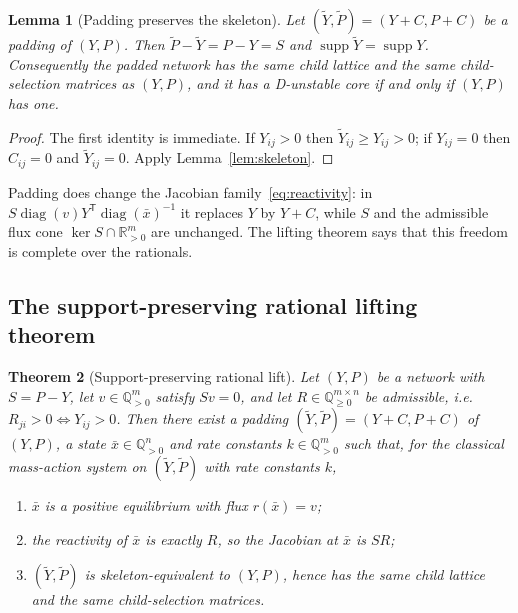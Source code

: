 \documentclass[11pt,a4paper]{article}
\theoremstyle{plain}
\newtheorem{theorem}{Theorem}[section]
\newtheorem{lemma}[theorem]{Lemma}
\theoremstyle{definition}
\theoremstyle{remark}
\newcommand{\R}{\mathbb{R}}
\newcommand{\Q}{\mathbb{Q}}
\newcommand{\diag}{\operatorname{diag}}
\newcommand{\supp}{\operatorname{supp}}
\newcommand{\Ytil}{\widetilde{Y}}
\newcommand{\Ptil}{\widetilde{P}}
\newcommand{\xbar}{\bar{x}}
\begin{document}
\begin{lemma}[Padding preserves the skeleton]\label{lem:padding}
Let $(\Ytil,\Ptil)=(Y+C,P+C)$ be a padding of $(Y,P)$. Then $\Ptil-\Ytil=P-Y=S$ and $\supp\Ytil=\supp Y$. Consequently the padded network has the same child lattice and the same child-selection matrices as $(Y,P)$, and it has a D-unstable core if and only if $(Y,P)$ has one.
\end{lemma}

\begin{proof}
The first identity is immediate. If $Y_{ij}>0$ then $\Ytil_{ij}\ge Y_{ij}>0$; if $Y_{ij}=0$ then $C_{ij}=0$ and $\Ytil_{ij}=0$. Apply Lemma~\ref{lem:skeleton}.
\end{proof}

Padding does change the Jacobian family~\eqref{eq:reactivity}: in $S\diag(v)Y^{\mathsf T}\diag(\xbar)^{-1}$ it replaces $Y$ by $Y+C$, while $S$ and the admissible flux cone $\ker S\cap\R^m_{>0}$ are unchanged. The lifting theorem says that this freedom is complete over the rationals.

\subsection{The support-preserving rational lifting theorem}

\begin{theorem}[Support-preserving rational lift]\label{thm:lift}
Let $(Y,P)$ be a network with $S=P-Y$, let $v\in\Q_{>0}^m$ satisfy $Sv=0$, and let $R\in\Q^{m\times n}_{\ge0}$ be admissible, i.e.\ $R_{ji}>0\iff Y_{ij}>0$. Then there exist a padding $(\Ytil,\Ptil)=(Y+C,P+C)$ of $(Y,P)$, a state $\xbar\in\Q_{>0}^n$ and rate constants $k\in\Q_{>0}^m$ such that, for the classical mass-action system on $(\Ytil,\Ptil)$ with rate constants $k$,
\begin{enumerate}[label=(\alph*)]
\item $\xbar$ is a positive equilibrium with flux $r(\xbar)=v$;
\item the reactivity of $\xbar$ is exactly $R$, so the Jacobian at $\xbar$ is $SR$;
\item $(\Ytil,\Ptil)$ is skeleton-equivalent to $(Y,P)$, hence has the same child lattice and the same child-selection matrices.
\end{enumerate}
\end{theorem}
\end{document}
